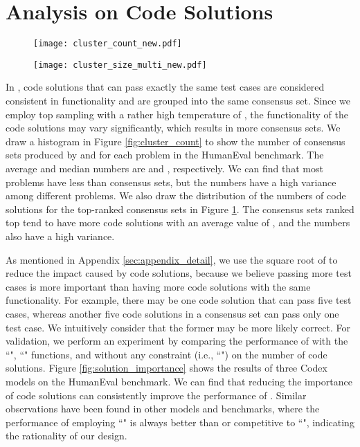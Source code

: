 \section{Analysis on Code Solutions}
\label{appendix_sqrt}

\begin{figure}[t]
\centering
\begin{minipage}{.49\textwidth}
  \centering
  \texttt{[image: cluster\_count\_new.pdf]}
  \label{fig:cluster_count}
\end{minipage}
\hspace{0.1cm}
\begin{minipage}{.49\textwidth}
  \centering
  \texttt{[image: cluster\_size\_multi\_new.pdf]}
  \label{fig:cluster_size}
\end{minipage}
\end{figure}

In \ours, code solutions that can pass exactly the same test cases are considered consistent in functionality and are grouped into the same consensus set. Since we employ top  sampling with a rather high temperature of , the functionality of the code solutions may vary significantly, which results in more consensus sets.  We draw a histogram in Figure \ref{fig:cluster_count} to show the number of consensus sets produced by \cushman and \ours for each problem in the HumanEval benchmark. The average and median numbers are  and , respectively. We can find that most problems have less than  consensus sets, but the numbers have a high variance among different problems. We also draw the distribution of the numbers of code solutions for the top-ranked consensus sets in Figure \ref{fig:cluster_size}. The consensus sets ranked top  tend to have more code solutions with an average value of , and the numbers also have a high variance.

As mentioned in Appendix \ref{sec:appendix_detail}, we use the square root of  to reduce the impact caused by code solutions, because we believe passing more test cases is more important than having more code solutions with the same functionality. For example, there may be one code solution that can pass five test cases, whereas another five code solutions in a consensus set can pass only one test case. We intuitively consider that the former may be more likely correct. 
For validation, we perform an experiment by comparing the performance of \ours with the ``", ``" functions, and without any constraint (i.e., ``") on the number of code solutions. Figure \ref{fig:solution_importance} shows the results of three Codex models on the HumanEval benchmark. We can find that reducing the importance of code solutions can consistently improve the performance of \ours. Similar observations have been found in other models and benchmarks, where the performance of employing ``" is always better than or competitive to ``", indicating the rationality of our design.




